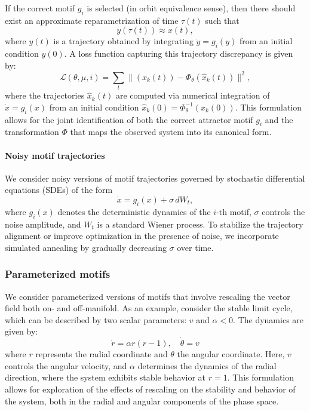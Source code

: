 \documentclass{article}
\theoremstyle{definition} \newtheorem{definition}{Definition}  \newtheorem{example}{Example}
\theoremstyle{remark} \newtheorem{remark}{Remark}
\newcommand{\reals}{\mathbb{R}}
\newcounter{ct}
\begin{document}
 If the correct motif \( g_i \) is selected (in orbit equivalence sense), then there should exist an approximate reparametrization of time \( \tau(t) \) such that
\[
y(\tau(t)) \approx x(t),
\]
where \( y(t) \) is a trajectory obtained by integrating \( \dot{y} = g_i(y) \) from an initial condition \( y(0) \). 
A loss function capturing this trajectory discrepancy is given by:
\[
\mathcal{L}(\theta, \mu, i) = \sum_{t} \Big\| (x_k(t)) - \Phi_\theta(\hat{x}_k(t)) \Big\|^2,
\]
where the trajectories \( \hat{x}_k(t) \) are computed via numerical integration of \(\dot x =  g_i(x) \) from an initial condition $\hat x_k(0) = \Phi_\theta^{-1}(x_k(0))$. %
This formulation allows for the joint identification of both the correct attractor motif \( g_i \) and the transformation \( \Phi \) that maps the observed system into its canonical form.


\paragraph{Noisy motif trajectories}
We consider noisy versions of motif trajectories governed by stochastic differential equations (SDEs) of the form
\begin{equation}
\dot x = g_i(x) + \sigma \, dW_t,
\end{equation}
where \( g_i(x) \) denotes the deterministic dynamics of the \( i \)-th motif, \( \sigma \) controls the noise amplitude, and \( W_t \) is a standard Wiener process.
To stabilize the trajectory alignment or improve optimization in the presence of noise, we incorporate simulated annealing by gradually decreasing \( \sigma \) over time.


\subsubsection{Parameterized motifs}
We consider parameterized versions of motifs that involve rescaling the vector field both on- and off-manifold.
As an example, consider the stable limit cycle, which can be described by two scalar parameters: \( v \) and \( \alpha < 0 \).
The dynamics are given by:
\begin{equation}
\dot{r} = \alpha r (r - 1), %
\quad \dot{\theta} = v
\end{equation}
where \( r \) represents the radial coordinate and \( \theta \) the angular coordinate. Here, \( v \) controls the angular velocity, and \( \alpha \) determines the dynamics of the radial direction, where the system exhibits stable behavior at \( r = 1 \). This formulation allows for exploration of the effects of rescaling on the stability and behavior of the system, both in the radial and angular components of the phase space.
\end{document}
